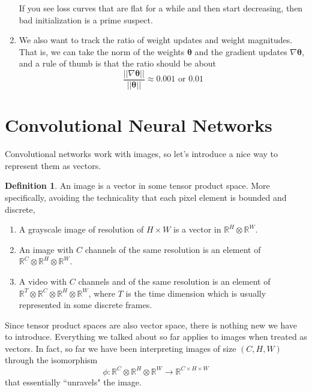\documentclass{article}
\theoremstyle{definition}
\theoremstyle{remark}
\theoremstyle{definition}
\newtheorem{definition}{Definition}[section]
\begin{document}
\begin{enumerate}
\begin{center}
      \end{center}
      If you see loss curves that are flat for a while and then start decreasing, then bad initialization is a prime suspect. 
      \item We also want to track the ratio of weight updates and weight magnitudes. That is, we can take the norm of the weights $\boldsymbol{\theta}$ and the gradient updates $\nabla \boldsymbol{\theta}$, and a rule of thumb is that the ratio should be about 
      \[\frac{||\nabla \boldsymbol{\theta}||}{||\boldsymbol{\theta}||} \approx 0.001 \text{ or } 0.01\]
    \end{enumerate}

\section{Convolutional Neural Networks}

  Convolutional networks work with images, so let's introduce a nice way to represent them as vectors. 

  \begin{definition} 
    An image is a vector in some tensor product space. More specifically, avoiding the technicality that each pixel element is bounded and discrete,  

    \begin{enumerate}
      \item A grayscale image of resolution of $H \times W$ is a vector in $\mathbb{R}^{H} \otimes \mathbb{R}^{W}$. 

      \item An image with $C$ channels of the same resolution is an element of $\mathbb{R}^{C} \otimes \mathbb{R}^H \otimes \mathbb{R}^W$. 

      \item A video with $C$ channels and of the same resolution is an element of $\mathbb{R}^T \otimes \mathbb{R}^C \otimes \mathbb{R}^H \otimes \mathbb{R}^W$, where $T$ is the time dimension which is usually represented in some discrete frames.
    \end{enumerate}

    Since tensor product spaces are also vector space, there is nothing new we have to introduce. Everything we talked about so far applies to images when treated as vectors. In fact, so far we have been interpreting images of size $(C, H, W)$ through the isomorphism 
    \[\phi: \mathbb{R}^{C} \otimes \mathbb{R}^H \otimes \mathbb{R}^W \rightarrow \mathbb{R}^{C \times H \times W}\]
    that essentially ``unravels" the image. 
  \end{definition}
\end{document}
